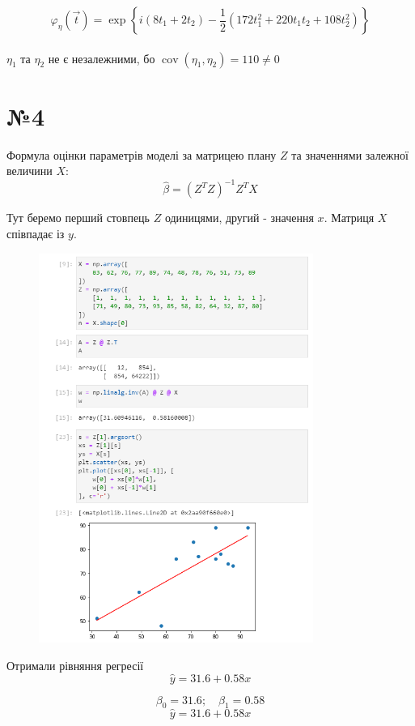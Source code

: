 \documentclass[11pt, a4paper]{article} %
\DeclareMathOperator{\cov}{cov}
\begin{document}
$$\varphi_{\eta}(\vec t) = \exp \left\{ i(8t_1 + 2t_2) - \frac{1}{2} (172t_1^2 + 220t_1t_2 + 108t_2^2) \right\}$$
\\

$\eta_1$ та $\eta_2$ не є незалежними, бо $\cov(\eta_1,\eta_2) = 110 \ne 0$


\pagebreak

\section*{№4}

Формула оцінки параметрів моделі за матрицею плану $Z$ та значеннями залежної величини $X$:
$$\hat \beta = \left(Z^T Z\right)^{-1}Z^T X$$

Тут беремо перший стовпець $Z$ одиницями, другий - значення $x$.
Матриця $X$ співпадає із $y$.

\begin{figure}[h]
    \centering
    \includegraphics[width=0.8\textwidth]{task4.png}
\end{figure}
\pagebreak

Отримали рівняння регресії
$$\hat y = 31.6 + 0.58 x$$

\begin{mdframed}[style=ans]
    $$\beta_0 = 31.6;\quad \beta_1 = 0.58$$
    $$\hat y = 31.6 + 0.58 x$$
\end{mdframed}
\end{document}
